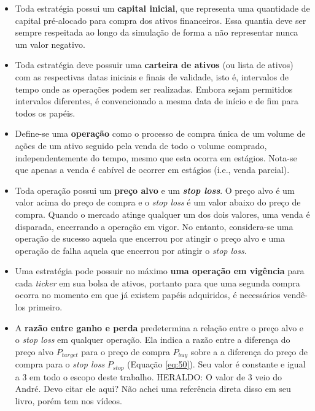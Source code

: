 \begin{itemize}
    \item Toda estratégia possui um \textbf{capital inicial}, que representa uma quantidade de capital pré-alocado para compra dos ativos financeiros. Essa quantia deve ser sempre respeitada ao longo da simulação de forma a não representar nunca um valor negativo.

    \item Toda estratégia deve possuir uma \textbf{carteira de ativos} (ou lista de ativos) com as respectivas datas iniciais e finais de validade, isto é, intervalos de tempo onde as operações podem ser realizadas. Embora sejam permitidos intervalos diferentes, é convencionado a mesma data de início e de fim para todos os papéis.

    \item Define-se uma  \textbf{operação} como o processo de compra única de um volume de ações de um ativo seguido pela venda de todo o volume comprado, independentemente do tempo, mesmo que esta ocorra em estágios. Nota-se que apenas a venda é cabível de ocorrer em estágios (i.e., venda parcial).

    \item Toda operação possui um \textbf{preço alvo} e um \textbf{\textit{stop loss}}. O preço alvo é um valor acima do preço de compra e o \textit{stop loss} é um valor abaixo do preço de compra. Quando o mercado atinge qualquer um dos dois valores, uma venda é disparada, encerrando a operação em vigor. No entanto, considera-se uma operação de sucesso aquela que encerrou por atingir o preço alvo e uma operação de falha aquela que encerrou por atingir o \textit{stop loss}.

    \item Uma estratégia pode possuir no máximo  \textbf{uma operação em vigência} para cada \textit{ticker} em sua bolsa de ativos, portanto para que uma segunda compra ocorra no momento em que já existem papéis adquiridos, é necessários vendê-los primeiro.

    \item A \textbf{razão entre ganho e perda} predetermina a relação entre o preço alvo e o \textit{stop loss} em qualquer operação. Ela indica a razão entre a diferença do preço alvo \begin{math} P_{target} \end{math} para o preço de compra \begin{math} P_{buy} \end{math} sobre a a diferença do preço de compra para o \textit{stop loss} \begin{math} P_{stop} \end{math} (Equação \ref{eq:50}). Seu valor é constante e igual a 3 em todo o escopo deste trabalho. \color{red} HERALDO: O valor de 3 veio do André. Devo citar ele aqui? Não achei uma referência direta disso em seu livro, porém tem nos vídeos. 


\end{itemize}
